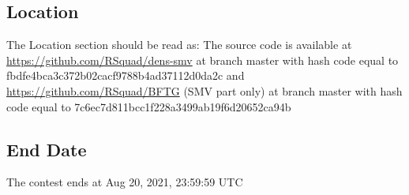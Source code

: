 \subsection{Location}

The Location section should be read as:
The source code is available at \url{https://github.com/RSquad/dens-smv} at branch master with
hash code equal to fbdfe4bca3c372b02cacf9788b4ad37112d0da2c
and
\url{https://github.com/RSquad/BFTG} (SMV part only) at branch master with hash code equal to
7c6ec7d811bcc1f228a3499ab19f6d20652ca94b

\subsection{End Date}
The contest ends at Aug 20, 2021, 23:59:59 UTC
